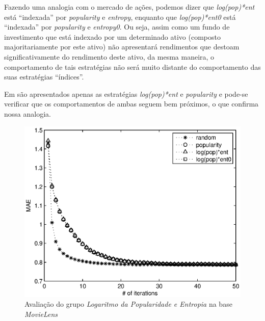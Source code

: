 Fazendo uma analogia com o mercado de ações, podemos dizer que \textit{log(pop)*ent} está ``indexada'' por \textit{popularity} e \textit{entropy}, enquanto que \textit{log(pop)*ent0} está ``indexada'' por \textit{popularity} e \textit{entropy0}. Ou seja, assim como um fundo de investimento que está indexado por um determinado ativo (composto majoritariamente por este ativo) não apresentará rendimentos que destoam significativamente do rendimento deste ativo, da mesma maneira, o comportamento de tais estratégias não será muito distante do comportamento das suas estratégias ``índices''.

Em \citep{Elahi:2014:ALS:2542182.2542195} são apresentados apenas as estratégias \textit{log(pop)*ent} e \textit{popularity} e pode-se verificar que os comportamentos de ambas seguem bem próximos, o que confirma nossa analogia. 

\begin{figure}[ht]
\centering
\includegraphics{ml_logpopent_logpop_ent0.eps}
\caption{Avaliação do grupo \textit{Logaritmo da Popularidade e Entropia} na base \textit{MovieLens}}
\label{fig:logpop-entropia-movielens}
\end{figure}

